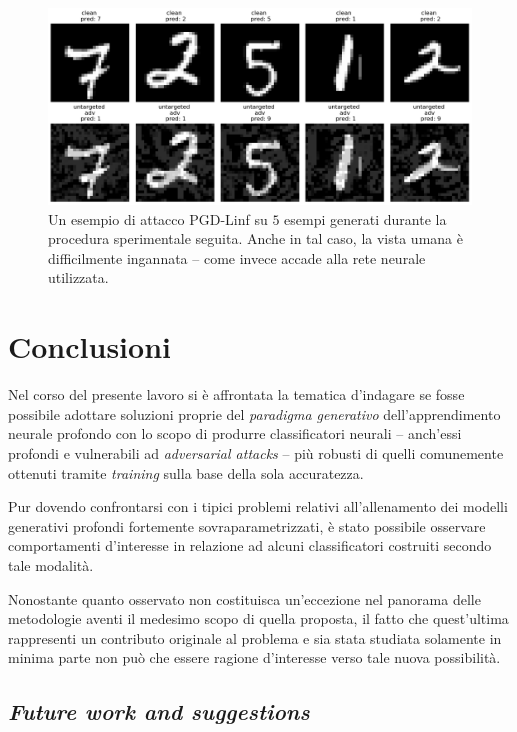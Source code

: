 \documentclass[a4paper, twoside]{article}
\begin{document}
\begin{figure}[H]
	\centering
	\includegraphics[scale=0.4]{mnist-adv-pgdlinf.png}
	\captionsetup{labelformat=empty}
	\caption{Un esempio di attacco PGD-Linf su $5$ esempi generati durante la procedura sperimentale seguita. Anche in tal caso, la vista umana è difficilmente ingannata -- come invece accade alla rete neurale utilizzata.}
\end{figure}


\newpage
\section{Conclusioni}

Nel corso del presente lavoro si è affrontata la tematica d'indagare se fosse possibile adottare soluzioni proprie del \textit{paradigma generativo} dell'apprendimento neurale profondo con lo scopo di produrre classificatori neurali -- anch'essi profondi e vulnerabili ad \textit{adversarial attacks} -- più robusti di quelli comunemente ottenuti tramite \textit{training} sulla base della sola accuratezza.

Pur dovendo confrontarsi con i tipici problemi relativi all'allenamento dei modelli generativi profondi fortemente sovraparametrizzati, è stato possibile osservare comportamenti d'interesse in relazione ad alcuni classificatori costruiti secondo tale modalità.

Nonostante quanto osservato non costituisca un'eccezione nel panorama delle metodologie aventi il medesimo scopo di quella proposta, il fatto che quest'ultima rappresenti un contributo originale al problema e sia stata studiata solamente in minima parte non può che essere ragione d'interesse verso tale nuova possibilità.

\subsection{\textit{Future work and suggestions}}
\end{document}
